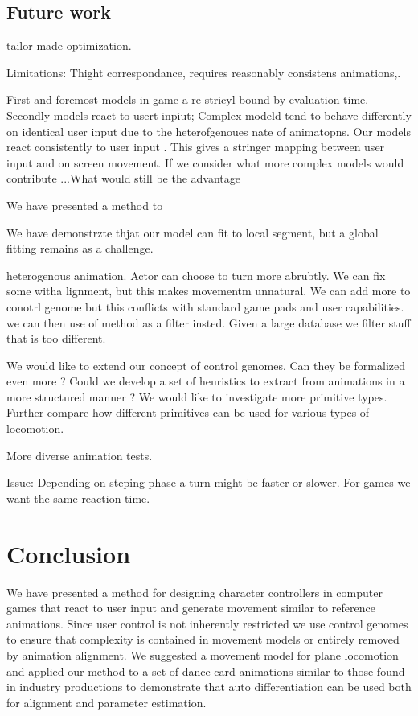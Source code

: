 \subsection{Future work}
tailor made optimization.

Limitations: Thight correspondance, requires reasonably consistens animations,.



First and foremost models in game a re stricyl bound by evaluation time. Secondly models react to usert inpiut; Complex modeld tend to behave differently on identical user input due to the heterofgenoues nate of animatopns. Our models react consistently to user input . This gives a stringer mapping between user input and on screen movement.
If we consider what more complex models would contribute ...What would still be the advantage



We have presented a method to 

We have demonstrzte thjat our model can fit to local segment, but a global fitting remains as a challenge.

heterogenous animation. Actor can choose to turn more abrubtly. We can fix some witha lignment, but this makes movementm unnatural. We can add more to conotrl genome but this conflicts with standard game pads and user capabilities. we can then use of method as a filter insted. Given a large database we filter stuff that is too different.


We would like to extend our concept of control genomes. Can they be formalized even more ? Could we develop a set of heuristics to extract from animations in a more structured manner ? 
We would like to investigate more primitive types. Further compare how different primitives can be used for various types of locomotion.

More diverse animation tests.


Issue: Depending on steping phase a turn might be faster or slower. For games we want the same reaction time.

\section{Conclusion}
We have presented a method for designing character controllers in computer games that react to user input and generate movement similar to reference animations. Since user control is not inherently restricted we use control genomes to ensure that complexity is contained in movement models or entirely removed by animation alignment. We suggested a movement model for plane locomotion and applied our method to a set of dance card animations similar to those found in industry productions to demonstrate that auto differentiation can be used both for alignment and parameter estimation.  




